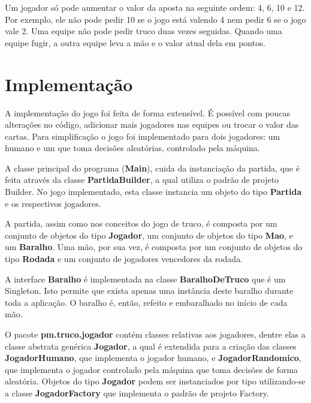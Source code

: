 \documentclass[a4paper,12pt]{article}
\begin{document}
Um jogador só pode aumentar o valor da aposta na seguinte ordem: 4, 6, 10 e 12. Por exemplo, ele não pode pedir 10 se o jogo está valendo 4 nem pedir 6 se o jogo vale 2. Uma equipe não pode pedir truco duas vezes seguidas. Quando uma equipe fugir, a outra equipe leva a mão e o valor atual dela em pontos.

\newpage

\section{Implementação}

A implementação do jogo foi feita de forma extensível. É possível com poucas alterações no código, adicionar mais jogadores nas equipes ou trocar o valor das cartas. Para simplificação o jogo foi implementado para dois jogadores: um humano e um que toma decisões aleatórias, controlado pela máquina.

A classe principal do programa (\textbf{Main}), cuida da instanciação da partida, que é feita através da classe \textbf{PartidaBuilder}, a qual utiliza o padrão de projeto Builder. No jogo implementado, esta classe instancia um objeto do tipo \textbf{Partida} e os respectivos jogadores.

A partida, assim como nos conceitos do jogo de truco, é composta por um conjunto de objetos do tipo \textbf{Jogador}, um conjunto de objetos do tipo \textbf{Mao}, e um \textbf{Baralho}. Uma mão, por sua vez, é composta por um conjunto de objetos do tipo \textbf{Rodada} e um conjunto de jogadores vencedores da rodada.

A interface \textbf{Baralho} é implementada na classe \textbf{BaralhoDeTruco} que é um Singleton. Isto permite que exista apenas uma instância deste baralho durante toda a aplicação. O baralho é, então, refeito e embaralhado no início de cada mão.

O pacote \textbf{pm.truco.jogador} contém classes relativas aos jogadores, dentre elas a classe abstrata genérica \textbf{Jogador}, a qual é extendida para a criação das classes \textbf{JogadorHumano}, que implementa o jogador humano, e \textbf{JogadorRandomico}, que implementa o jogador controlado pela máquina que toma decisões de forma aleatória. Objetos do tipo \textbf{Jogador} podem ser instanciados por tipo utilizando-se a classe \textbf{JogadorFactory} que implementa o padrão de projeto Factory.
\end{document}
